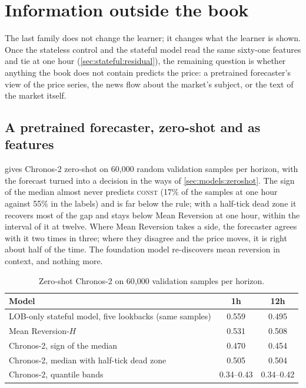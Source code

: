 \section{Information outside the book}
\label{ch:external}

The last family does not change the learner; it changes what the learner is shown.  Once
the stateless control and the stateful model read the same sixty-one features and tie at
one hour (\cref{sec:stateful:residual}), the remaining question is whether anything the
book does not contain predicts the price: a pretrained forecaster's view of the price
series, the news flow about the market's subject, or the text of the market itself.

\subsection{A pretrained forecaster, zero-shot and as features}
\label{sec:external:tsfm}
\label{sec:exp:tsfm}

 gives Chronos-2 zero-shot on 60{,}000 random validation samples per
horizon, with the forecast turned into a decision in the ways of \cref{sec:models:zeroshot}.
The sign of the median almost never predicts \textsc{const} (17\% of the samples at one hour
against 55\% in the labels) and is far below the rule; with a half-tick dead zone it recovers
most of the gap and stays below Mean Reversion at one hour, within the interval of it at
twelve.  Where Mean Reversion takes a side, the forecaster agrees with it two times in
three; where they disagree and the price moves, it is right about half of the time.  The
foundation model re-discovers mean reversion in context, and nothing more.

\begin{table}[t]
\centering
\caption{Zero-shot Chronos-2 on 60{,}000 validation samples per horizon.}
\label{tab:exp:tsfm}
\begin{fittable}\begin{tabular}{lcc}
\toprule
Model & 1h & 12h \\
\midrule
LOB-only stateful model, five lookbacks (same samples) & 0.559 & 0.495 \\
Mean Reversion-$H$                             & 0.531 & 0.508 \\
Chronos-2, sign of the median                  & 0.470 & 0.454 \\
Chronos-2, median with half-tick dead zone     & 0.505 & 0.504 \\
Chronos-2, quantile bands                      & 0.34--0.43 & 0.34--0.42 \\
\bottomrule
\end{tabular}\end{fittable}
\end{table}

